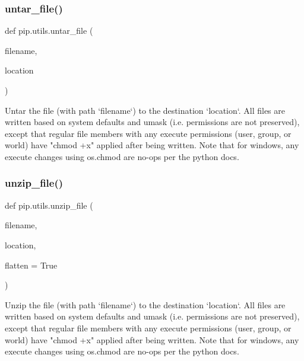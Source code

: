 \mbox{\label{namespacepip_1_1utils_acec3a95969ac24c6df26c7842dfd8644}} 
\subsubsection{\texorpdfstring{untar\+\_\+file()}{untar\_file()}}
{\footnotesize\ttfamily def pip.\+utils.\+untar\+\_\+file (\begin{DoxyParamCaption}\item[{}]{filename,  }\item[{}]{location }\end{DoxyParamCaption})}

\begin{DoxyVerb}Untar the file (with path `filename`) to the destination `location`.
All files are written based on system defaults and umask (i.e. permissions
are not preserved), except that regular file members with any execute
permissions (user, group, or world) have "chmod +x" applied after being
written.  Note that for windows, any execute changes using os.chmod are
no-ops per the python docs.
\end{DoxyVerb}
 \mbox{\label{namespacepip_1_1utils_a347d0ea57e212bff4fc9e79bdca31a7b}} 
\subsubsection{\texorpdfstring{unzip\+\_\+file()}{unzip\_file()}}
{\footnotesize\ttfamily def pip.\+utils.\+unzip\+\_\+file (\begin{DoxyParamCaption}\item[{}]{filename,  }\item[{}]{location,  }\item[{}]{flatten = {\ttfamily True} }\end{DoxyParamCaption})}

\begin{DoxyVerb}Unzip the file (with path `filename`) to the destination `location`.  All
files are written based on system defaults and umask (i.e. permissions are
not preserved), except that regular file members with any execute
permissions (user, group, or world) have "chmod +x" applied after being
written. Note that for windows, any execute changes using os.chmod are
no-ops per the python docs.
\end{DoxyVerb}
 

